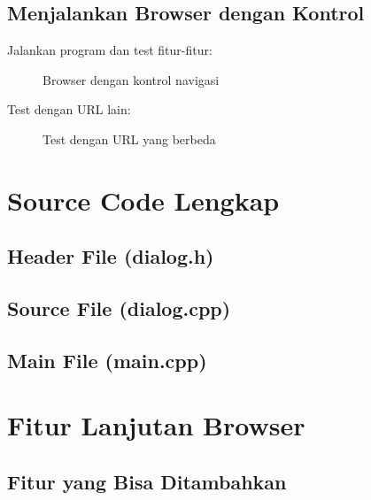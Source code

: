 

\subsection{Menjalankan Browser dengan Kontrol}

Jalankan program dan test fitur-fitur:

\begin{figure}[htbp]
\centering
{}
\caption{Browser dengan kontrol navigasi}
\end{figure}

Test dengan URL lain:

\begin{figure}[htbp]
\centering
{}
\caption{Test dengan URL yang berbeda}
\end{figure}

\section{Source Code Lengkap}

\subsection{Header File (dialog.h)}



\subsection{Source File (dialog.cpp)}



\subsection{Main File (main.cpp)}



\section{Fitur Lanjutan Browser}

\subsection{Fitur yang Bisa Ditambahkan}

